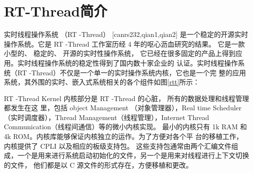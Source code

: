 \section{RT-Thread简介}
实时线程操作系统 （RT -Thread）
[canrs232,qian1,qian2]
是一个稳定的开源实时操作系统。它是 RT -Thread
工作室历经 4 年的呕心沥血研究的结果。 它是一款小型的、 稳定的、 开源的实时性操作系统，
它已经在很多固定的产品上得到应用。实时线程操作系统的稳定性得到了国内数十家企业的
认证。实时线程操作系统（RT -Thread）不仅是一个单一的实时操作系统内核，它也是一个完
整的应用系统，其外围的实时、嵌入式系统相关的各个组件如图\ref{rtt}所示：

RT -Thread Kernel 内核部分是 RT -Thread 的心脏， 所有的数据处理和线程管理都发生在这
里，包括 object  Management （对象管理器），Real  time  Scheduler（实时调度器），Thread
Management（线程管理），Internet Thread Communication（线程间通信）等的微小内核实现。
最小的内核只有 1k  RAM 和 4k  ROM。内核库能够保证内核独立的运作。为了方便对各个平
台的移植工作， 内核提供了 CPLI 以及相应的板级支持包。 这些支持包通常由两个汇编文件组
成，一个是用来进行系统启动初始化的文件，另一个是用来对线程进行上下文切换的文件，
他们都是以 C 源文件的形式存在，方便移植和更改。















